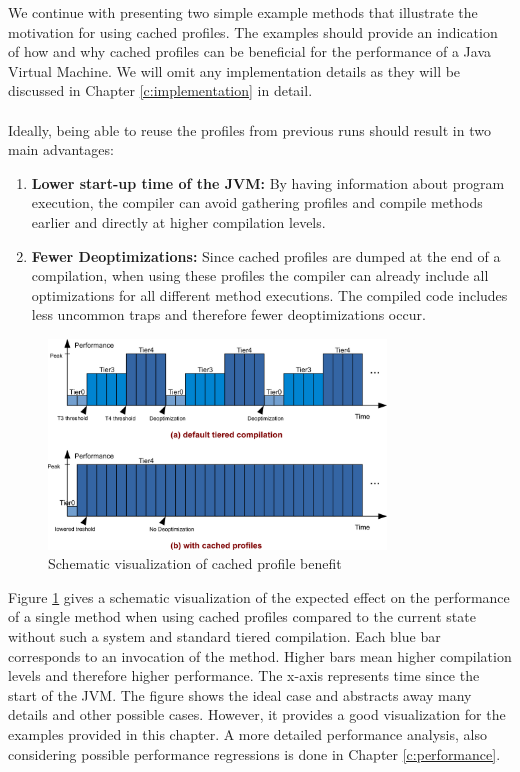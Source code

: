 We continue with presenting two simple example methods that illustrate the motivation for using cached profiles.
The examples should provide an indication of how and why cached profiles can be beneficial for the performance of a Java Virtual Machine.
We will omit any implementation details as they will be discussed in Chapter \ref{c:implementation} in detail.
\\\\
Ideally, being able to reuse the profiles from previous runs should result in two main advantages:
\begin{enumerate}
  \item \textbf{Lower start-up time of the JVM:} By having information about program execution, the compiler can avoid gathering profiles and compile methods earlier and directly at higher compilation levels.
  \item \textbf{Fewer Deoptimizations:} Since cached profiles are dumped at the end of a compilation, when using these profiles the compiler can already include all optimizations for all different method executions. The compiled code includes less uncommon traps and therefore fewer deoptimizations occur.
\end{enumerate}
\begin{figure}[ht!]
  \begin{center}
    \centering
    \includegraphics[width=0.8\textwidth]{figures/baseline_vs_usage_large.png}
    \caption{Schematic visualization of cached profile benefit}
    \label{f:baseline_vs_usage}
  \end{center}
\end{figure}
Figure \ref{f:baseline_vs_usage} gives a schematic visualization of the expected effect on the performance of a single method when using cached profiles compared to the current state without such a system and standard tiered compilation.
Each blue bar corresponds to an invocation of the method. Higher bars mean higher compilation levels and therefore higher performance. The x-axis represents time since the start of the JVM. The figure shows the ideal case and abstracts away many details and other possible cases. However, it provides a good visualization for the examples provided in this chapter. A more detailed performance analysis, also considering possible performance regressions is done in Chapter \ref{c:performance}.
